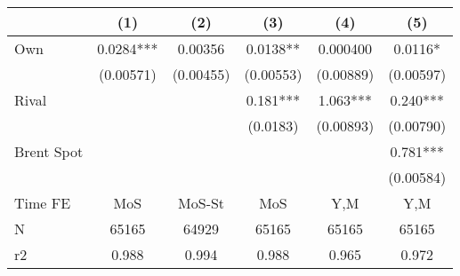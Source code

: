 {
\def\sym#1{\ifmmode^{#1}\else\(^{#1}\)\fi}
\begin{tabular}{l*{5}{c}}
\toprule
                &\multicolumn{1}{c}{(1)}   &\multicolumn{1}{c}{(2)}   &\multicolumn{1}{c}{(3)}   &\multicolumn{1}{c}{(4)}   &\multicolumn{1}{c}{(5)}   \\
\midrule
Own             &   0.0284***&  0.00356   &   0.0138** & 0.000400   &   0.0116*  \\
                &(0.00571)   &(0.00455)   &(0.00553)   &(0.00889)   &(0.00597)   \\
\addlinespace
Rival           &            &            &    0.181***&    1.063***&    0.240***\\
                &            &            & (0.0183)   &(0.00893)   &(0.00790)   \\
\addlinespace
Brent Spot      &            &            &            &            &    0.781***\\
                &            &            &            &            &(0.00584)   \\
\midrule
Time FE         &      MoS   &   MoS-St   &      MoS   &      Y,M   &      Y,M   \\
N               &    65165   &    64929   &    65165   &    65165   &    65165   \\
r2              &    0.988   &    0.994   &    0.988   &    0.965   &    0.972   \\
\bottomrule
\end{tabular}
}
